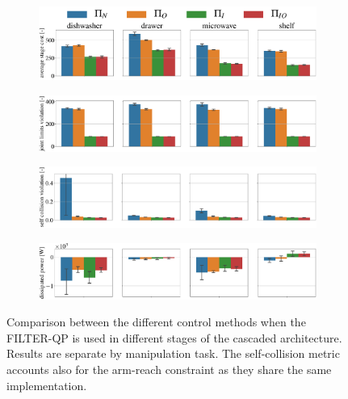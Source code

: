\begin{figure}[t]
\centering
\hspace*{-0.2cm}
\vspace*{0.15cm}
\begin{subfigure}{1\columnwidth}
    \includegraphics[width=\linewidth]{figures/methods_comparison/average_stage_cost.pdf}
\end{subfigure}%
\hfill
\hspace*{-0.2cm}
\vspace*{0.1cm}
\begin{subfigure}{\columnwidth}
    \includegraphics[width=\linewidth]{figures/methods_comparison/joint_limits.pdf}
\end{subfigure}%
\hfill
\hspace*{-0.2cm}
\vspace*{0.1cm}
\begin{subfigure}{\columnwidth}
    \includegraphics[width=\linewidth]{figures/methods_comparison/self_collision.pdf}
\end{subfigure}
\hspace*{-0.2cm} 
\vspace*{0.1cm}
\begin{subfigure}{\columnwidth}
    \includegraphics[width=\linewidth]{figures/methods_comparison/dissipated_power.pdf}
\end{subfigure}
\hfill
\caption{Comparison between the different control methods when the FILTER-QP is used in different stages of the cascaded architecture. Results are separate by manipulation task. The self-collision metric accounts also for the arm-reach constraint as they share the same implementation.}\label{fig:methods_comparison}
\end{figure}

